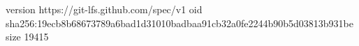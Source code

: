 version https://git-lfs.github.com/spec/v1
oid sha256:19ecb8b68673789a6bad1d31010badbaa91cb32a0fe2244b90b5d03813b931be
size 19415
